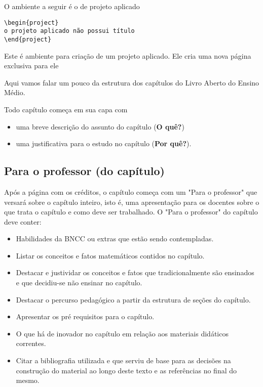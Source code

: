 O ambiente a seguir é o de projeto aplicado
\begin{verbatim}
\begin{project}
o projeto aplicado não possui título
\end{project}
\end{verbatim}

\begin{project}
Este é ambiente para criação de um projeto aplicado. Ele cria uma nova página exclusiva para ele

\end{project}


Aqui vamos falar um pouco da estrutura dos capítulos do Livro Aberto do Ensino Médio.

Todo capítulo começa em sua capa com 

\begin{itemize}
\item uma breve descrição do assunto do capítulo (\textbf{O quê?})
\item uma justificativa para o estudo no capítulo (\textbf{Por quê?}).
\end{itemize} 

\subsection{Para o professor (do capítulo)}
Após a página com os créditos, o capítulo começa com um "Para o professor" que versará sobre o capítulo inteiro, isto é, uma apresentação para os docentes sobre o que trata o capítulo e como deve ser trabalhado. O "Para o professor" do capítulo deve conter:

\begin{itemize}
\item Habilidades da BNCC ou extras que estão sendo contempladas.
\item Listar os conceitos e fatos matemáticos contidos no capítulo.
\item Destacar e justividar os conceitos e fatos que tradicionalmente são ensinados e que decidiu-se não ensinar no capítulo.
\item Destacar o percurso pedagógico a partir da estrutura de seções do capítulo.
\item Apresentar os pré requisitos para o capítulo.
\item O que há de inovador no capítulo em relação aos materiais didáticos correntes.
\item Citar a bibliografia utilizada e que serviu de base para as decisões na construção do material ao longo deste texto e as referências no final do mesmo.
\end{itemize}

